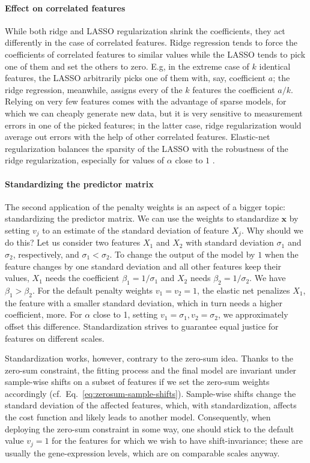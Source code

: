 \paragraph{Effect on correlated features}
While both ridge and LASSO regularization shrink the coefficients, they act differently in the case 
of correlated features. Ridge regression tends to force the coefficients of correlated features to 
similar values while the LASSO tends to pick one of them and set the others to zero. E.g, in the 
extreme case of $k$ identical features, the LASSO arbitrarily picks one of them with, say, 
coefficient $a$; the ridge regression, meanwhile, assigns every of the $k$ features the coefficient 
$a/k$. Relying on very few features comes with the advantage of sparse models, for which we 
can cheaply generate new data, but it is very sensitive to measurement errors in one of the picked 
features; in the latter case, ridge regularization would average out errors with the help of other 
correlated features. Elastic-net regularization balances the sparsity of the LASSO with the 
robustness of the ridge regularization, especially for values of $\alpha$ close to $1$ 
\cite{elasticnet05}.


\paragraph{Standardizing the predictor matrix} 
The second application of the penalty weights is an aspect of a bigger topic: standardizing the
predictor matrix. We can use the weights to standardize $\mathbf{x}$ by setting $v_j$ to an estimate 
of the standard deviation of feature $X_j$. Why 
should we do this? Let us consider two features $X_1$ and $X_2$ with standard deviation $\sigma_1$
and $\sigma_2$, respectively, and $\sigma_1 < \sigma_2$. To change the output of the model by $1$ 
when the feature changes by 
one standard deviation and all other features keep their values, $X_1$ needs the coefficient 
$\beta_1 = 1/\sigma_1$ and $X_2$ needs $\beta_2 = 1/\sigma_2$. We have $\beta_1 > \beta_2$. For 
the default penalty weights $v_1 = v_2 = 1$, the elastic net penalizes $X_1$, the feature with a smaller 
standard deviation, which in turn needs a higher coefficient, more. For $\alpha$ close to 
\num{1}, setting $v_1 = \sigma_1, v_2 = \sigma_2$, we approximately offset this difference.
Standardization strives to guarantee equal justice for features 
on different scales. 

Standardization works, however, contrary to the zero-sum idea. Thanks to the 
zero-sum constraint, the fitting process and the final model are invariant under sample-wise 
shifts on a subset of features if we set the zero-sum weights accordingly (cf.\ Eq.\ 
\eqref{eq:zerosum-sample-shifts}). Sample-wise shifts 
change the standard deviation of the affected features, which, with standardization,
affects the cost function and likely leads to another model. 
Consequently, when deploying the zero-sum constraint in some way, one should stick to the default 
value $v_j = 1$ for the features for which we wish to have shift-invariance; these are usually the 
gene-expression levels, which are on comparable scales anyway.

